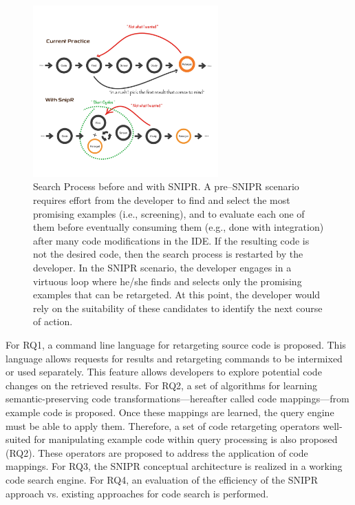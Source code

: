 \documentclass[conference]{IEEEtran}
\begin{document}
\begin{figure}[!t]
    \centering
    \includegraphics[width=2.8in]{images/searchprocess}
    \caption{Search Process before and with \uppercase{SnipR}. A pre--\uppercase{SnipR} scenario requires effort from the developer to find and select the most promising examples (i.e., screening), and to evaluate each one of them before eventually consuming them (e.g., done with integration) after many code modifications in the IDE. If the resulting code is not the desired code, then the search process is restarted by the developer. In the \uppercase{SnipR} scenario, the developer engages in a virtuous loop where he/she finds and selects only the promising examples that can be retargeted. At this point, the developer would rely on the suitability of these candidates to identify the next course of action.}
    \label{fig:retargeting}
\end{figure}
For RQ1, a command line language for retargeting source code is proposed. This language allows requests for results and retargeting commands to be intermixed or used separately. This feature allows developers to explore potential code changes on the retrieved results. For RQ2, a set of algorithms for learning semantic-preserving code transformations---hereafter called code mappings---from example code is proposed. Once these mappings are learned, the query engine must be able to apply them. Therefore, a set of code retargeting operators well-suited for manipulating example code within query processing is also proposed (RQ2). These operators are proposed to address the application of code mappings. For RQ3, the \uppercase{SnipR} conceptual architecture is realized in a working code search engine. For RQ4, an evaluation of the efficiency of the \uppercase{SnipR} approach vs. existing approaches for code search is performed. 
\end{document}
